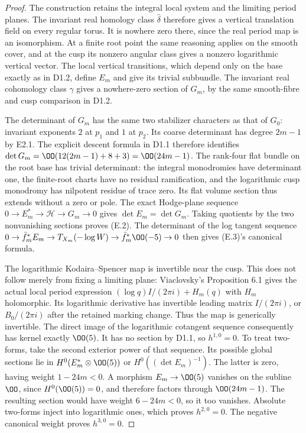\begin{proof}
The construction retains the integral local system and the limiting
period planes. The invariant real homology class $\widehat\delta$
therefore gives a vertical translation field on every regular torus.
It is nowhere zero there, since the real period map is an isomorphism.
At a finite root point the same reasoning applies on the smooth
cover, and at the cusp its nonzero angular class gives a nonzero
logarithmic vertical vector. The local vertical transitions, which
depend only on the base exactly as in D1.2, define $E_m$ and give its
trivial subbundle. The invariant real cohomology class $\gamma$ gives
a nowhere-zero section of $G_m$, by the same smooth-fibre and cusp
comparison in D1.2.

The determinant of $G_m$ has the same two stabilizer characters as
that of $G_0$: invariant exponents $2$ at $p_1$ and $1$ at $p_2$.
Its coarse determinant has degree $2m-1$ by E2.1. The explicit descent
formula in D1.1 therefore identifies
$\det G_m=\OO(12(2m-1)+8+3)=\OO(24m-1)$.
The rank-four flat bundle on the root base has trivial determinant:
the integral monodromies have determinant one, the finite-root charts
have no residual ramification, and the logarithmic cusp monodromy
has nilpotent residue of trace zero. Its flat volume section thus
extends without a zero or pole. The exact Hodge-plane sequence
$0\to E_m^*\to\mathcal H\to G_m\to0$ gives
$\det E_m=\det G_m$. Taking quotients by the two nonvanishing
sections proves (E.2). The determinant of the log tangent sequence
$0\to\bar f_m^*E_m\to T_{X_m}(-\log W)
\to\bar f_m^*\OO(-5)\to0$ then gives (E.3)'s canonical formula.

The logarithmic Kodaira--Spencer map is invertible near the cusp.
This does not follow merely from fixing a limiting plane:
Viaclovsky's Proposition 6.1 gives the actual local period expression
$(\log q)I/(2\pi i)+H_m(q)$ with $H_m$ holomorphic. Its logarithmic
derivative has invertible leading matrix $I/(2\pi i)$, or
$B_0/(2\pi i)$ after the retained marking change. Thus the map is
generically invertible. The direct image of the logarithmic
cotangent sequence consequently has kernel exactly $\OO(5)$.
It has no section by D1.1, so $h^{1,0}=0$. To treat two-forms, take
the second exterior power of that sequence. Its possible global
sections lie in
$H^0(E_m^*\otimes\OO(5))$ or
$H^0((\det E_m)^{-1})$.
The latter is zero, having weight $1-24m<0$. A morphism
$E_m\to\OO(5)$ vanishes on the subline $\OO$, since
$H^0(\OO(5))=0$, and therefore factors through $\OO(24m-1)$.
The resulting section would have weight $6-24m<0$, so it too
vanishes. Absolute two-forms inject into logarithmic ones, which
proves $h^{2,0}=0$. The negative canonical weight proves $h^{3,0}=0$.


\end{proof}
